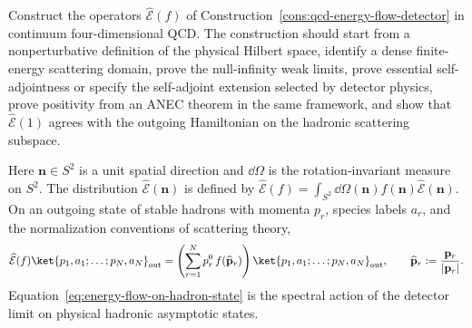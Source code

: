 \begin{openproblem}
\label{op:qcd-energy-flow-operator-construction}
Construct the operators \(\widehat{\mathcal E}(f)\) of
Construction~\ref{cons:qcd-energy-flow-detector} in continuum
four-dimensional QCD.  The construction should start from a nonperturbative
definition of the physical Hilbert space, identify a dense finite-energy
scattering domain, prove the null-infinity weak limits, prove essential
self-adjointness or specify the self-adjoint extension selected by detector
physics, prove positivity from an ANEC theorem in the same framework, and
show that \(\widehat{\mathcal E}(1)\) agrees with the outgoing Hamiltonian on
the hadronic scattering subspace.
\end{openproblem}

Here \(\mathbf n\in S^2\) is a unit spatial direction and \(\dd\Omega\) is the
rotation-invariant measure on \(S^2\).  The distribution
\(\widehat{\mathcal E}(\mathbf n)\) is defined by
\(\widehat{\mathcal E}(f)=\int_{S^2}\dd\Omega(\mathbf n)
f(\mathbf n)\widehat{\mathcal E}(\mathbf n)\).  On an outgoing state of
stable hadrons with momenta \(p_r\), species labels \(a_r\), and the
normalization conventions of scattering theory,
\begin{equation}
  \widehat{\mathcal E}(f)
  \ket{p_1,a_1;\ldots;p_N,a_N}_{\mathrm{out}}
  =
  \left(\sum_{r=1}^N p_r^0\,f(\widehat{\mathbf p}_r)\right)
  \ket{p_1,a_1;\ldots;p_N,a_N}_{\mathrm{out}},
  \qquad
  \widehat{\mathbf p}_r:=\frac{\mathbf p_r}{|\mathbf p_r|}.
  \label{eq:energy-flow-on-hadron-state}
\end{equation}
Equation~\eqref{eq:energy-flow-on-hadron-state} is the spectral action of the
detector limit on physical hadronic asymptotic states.

